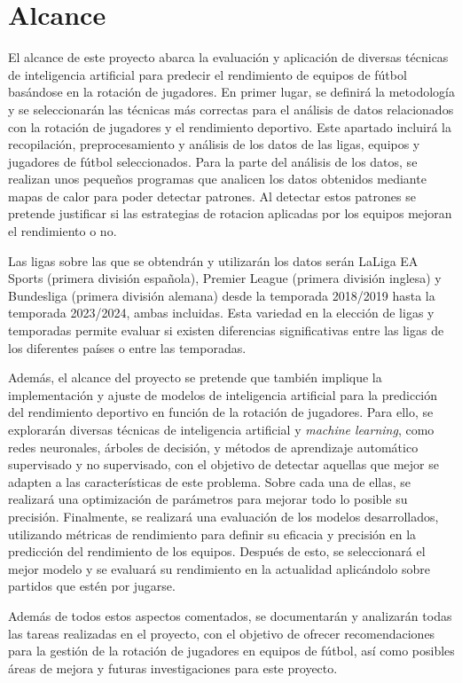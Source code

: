 \section{Alcance}
El alcance de este proyecto abarca la evaluación y aplicación de diversas técnicas de inteligencia artificial para predecir el rendimiento de equipos de fútbol basándose en la rotación de jugadores. En primer lugar, se definirá la metodología y se seleccionarán las técnicas más correctas para el análisis de datos relacionados con la rotación de jugadores y el rendimiento deportivo. Este apartado incluirá la recopilación, preprocesamiento y análisis de los datos de las ligas, equipos y jugadores de fútbol seleccionados. Para la parte del análisis de los datos, se realizan unos pequeños programas que analicen los datos obtenidos mediante mapas de calor para poder detectar patrones. Al detectar estos patrones se pretende justificar si las estrategias de rotacion aplicadas por los equipos mejoran el rendimiento o no.

Las ligas sobre las que se obtendrán y utilizarán los datos serán LaLiga EA Sports (primera división española), Premier League (primera división inglesa) y Bundesliga (primera división alemana) desde la temporada 2018/2019 hasta la temporada 2023/2024, ambas incluidas. Esta 
variedad en la elección de ligas y temporadas permite evaluar si existen diferencias significativas 
entre las ligas de los diferentes países o entre las temporadas.

Además, el alcance del proyecto se pretende que también implique la implementación y ajuste de modelos de inteligencia artificial para la predicción del rendimiento deportivo en función de la rotación de jugadores. Para ello, se explorarán diversas técnicas de inteligencia artificial y \textit{machine learning}, como redes neuronales, árboles de decisión, y métodos de aprendizaje automático supervisado y no supervisado, con el objetivo de detectar aquellas que mejor se adapten a las características de este problema. Sobre cada una de ellas, se realizará una optimización de parámetros para mejorar todo lo posible su precisión.
Finalmente, se realizará una evaluación de los modelos desarrollados, utilizando métricas de rendimiento para definir su eficacia y precisión en la predicción del rendimiento de los equipos. Después de esto, se seleccionará el mejor modelo y se evaluará su rendimiento en la actualidad aplicándolo sobre partidos que estén por jugarse.

Además de todos estos aspectos comentados, se documentarán y analizarán todas las tareas realizadas en el proyecto, con el objetivo de ofrecer recomendaciones para la gestión de la rotación de jugadores en equipos de fútbol, así como posibles áreas de mejora y futuras investigaciones para este proyecto.




